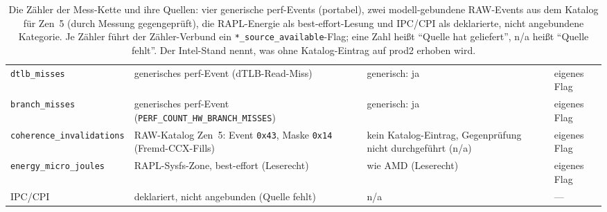\begin{nurkurz}
\begin{table}[htbp]
\begin{tabular}{@{}l>{\raggedright\arraybackslash}p{4.6cm}>{\raggedright\arraybackslash}p{3.2cm}>{\raggedright\arraybackslash}p{2.3cm}@{}}
\texttt{dtlb\_misses} & generisches perf-Event (dTLB-Read-Miss) & generisch: ja & eigenes Flag \\
\texttt{branch\_misses} & generisches perf-Event (\texttt{PERF\_COUNT\_\allowbreak{}HW\_\allowbreak{}BRANCH\_\allowbreak{}MISSES}) & generisch: ja & eigenes Flag \\
\texttt{coherence\_invalidations} & RAW-Katalog Zen~5: Event \texttt{0x43}, Maske \texttt{0x14} (Fremd-CCX-Fills) & kein Katalog-Eintrag, Gegenprüfung nicht durchgeführt (n/a) & eigenes Flag \\ %
\texttt{energy\_micro\_joules} & RAPL-Sysfs-Zone, best-effort (Leserecht) & wie AMD (Leserecht) & eigenes Flag \\
IPC/CPI & deklariert, nicht angebunden (Quelle fehlt) & n/a & --- \\
\bottomrule
\end{tabular}
\caption{Die Zähler der Mess-Kette und ihre Quellen: vier generische perf-Events (portabel), zwei
modell-gebundene RAW-Events aus dem Katalog für Zen~5 (durch Messung gegengeprüft), die RAPL-Energie als
best-effort-Lesung und IPC/CPI als deklarierte, nicht angebundene Kategorie. Je Zähler führt der
Zähler-Verbund ein \texttt{*\_source\_available}-Flag; eine Zahl heißt \enquote{Quelle hat geliefert},
n/a heißt \enquote{Quelle fehlt}. Der Intel-Stand nennt, was ohne Katalog-Eintrag auf prod2
erhoben wird.}\label{tab:eval-pmc-zaehler}
\end{table}
\end{nurkurz}

